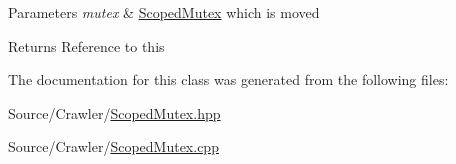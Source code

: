 \begin{DoxyParams}{Parameters}
{\em mutex} & \hyperlink{class_crawler_1_1_scoped_mutex}{Scoped\+Mutex} which is moved \\
\hline
\end{DoxyParams}
\begin{DoxyReturn}{Returns}
Reference to this 
\end{DoxyReturn}


The documentation for this class was generated from the following files\+:\begin{DoxyCompactItemize}
\item 
Source/\+Crawler/\hyperlink{_scoped_mutex_8hpp}{Scoped\+Mutex.\+hpp}\item 
Source/\+Crawler/\hyperlink{_scoped_mutex_8cpp}{Scoped\+Mutex.\+cpp}\end{DoxyCompactItemize}
